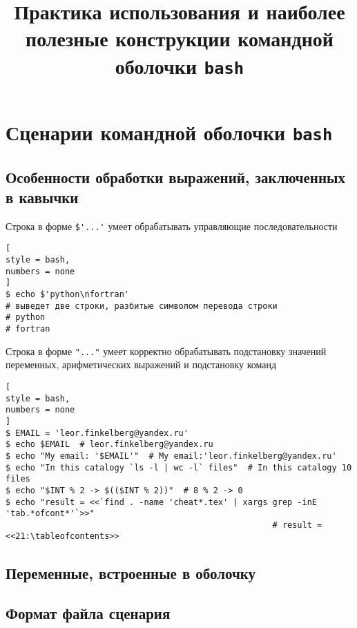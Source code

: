 \documentclass[%
	11pt,
	a4paper,
	utf8,
		]{article}
\begin{document}
\title{Практика использования и наиболее полезные конструкции командной оболочки \texttt{bash}}

\author{}

\date{}
\maketitle

\thispagestyle{fancy}

\tableofcontents

\section{Сценарии командной оболочки \texttt{bash}}

\subsection{Особенности обработки выражений, заключенных в кавычки}

Строка в форме \verb|$'...'| умеет обрабатывать управляющие последовательности
\begin{lstlisting}[
style = bash,
numbers = none
]
$ echo $'python\nfortran'
# выведет две строки, разбитые символом перевода строки
# python
# fortran
\end{lstlisting}

Строка в форме \verb|"..."| умеет корректно обрабатывать подстановку значений переменных, арифметических выражений и подстановку команд
\begin{lstlisting}[
style = bash,
numbers = none
]
$ EMAIL = 'leor.finkelberg@yandex.ru'
$ echo $EMAIL  # leor.finkelberg@yandex.ru
$ echo "My email: '$EMAIL'"  # My email:'leor.finkelberg@yandex.ru'
$ echo "In this catalogy `ls -l | wc -l` files"  # In this catalogy 10 files
$ echo "$INT % 2 -> $(($INT % 2))"  # 8 % 2 -> 0
$ echo "result = <<`find . -name 'cheat*.tex' | xargs grep -inE 'tab.*ofcont*'`>>"
                                                      # result = <<21:\tableofcontents>>
\end{lstlisting}



\subsection{Переменные, встроенные в оболочку}



\subsection{Формат файла сценария}
\end{document}
